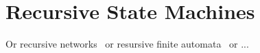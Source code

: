 \section{Recursive State Machines}

Or recursive networks~\cite{!!!} or resursive finite automata~\cite{!!!} or ...